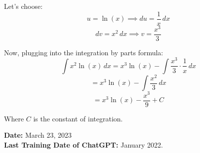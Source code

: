 \begin{itemize}
\begin{shaded}
Let's choose:
\[
u = \ln(x) \implies du = \frac{1}{x} \, dx
\]
\[
dv = x^2 \, dx \implies v = \frac{x^3}{3}
\]

Now, plugging into the integration by parts formula:
\[
\int x^2 \ln(x) \, dx = x^3 \ln(x) - \int \frac{x^3}{3} \cdot \frac{1}{x} \, dx
\]
\[
= x^3 \ln(x) - \int \frac{x^2}{3} \, dx
\]
\[
= x^3 \ln(x) - \frac{x^3}{9} + C
\]

Where \( C \) is the constant of integration.
\end{shaded}

\textbf{Date:} March 23, 2023 \\
\textbf{Last Training Date of ChatGPT:} January 2022.
\end{itemize}





